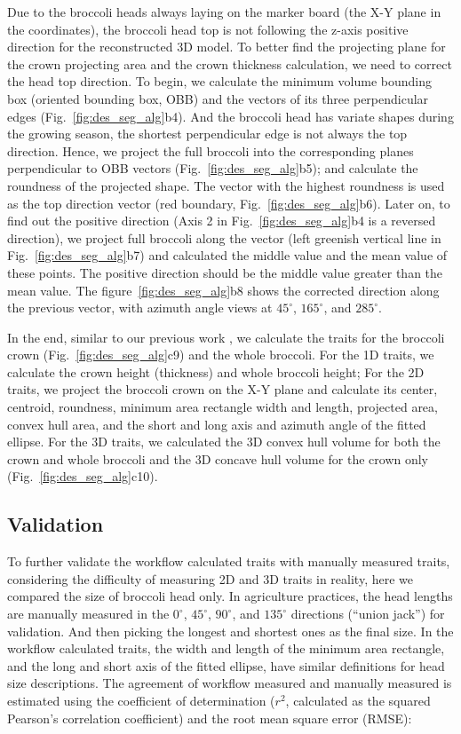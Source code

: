 Due to the broccoli heads always laying on the marker board (the X-Y plane in the coordinates), the broccoli head top is not following the z-axis positive direction for the reconstructed 3D model. To better find the projecting plane for the crown projecting area and the crown thickness calculation, we need to correct the head top direction. To begin, we calculate the minimum volume bounding box (oriented bounding box, OBB) and the vectors of its three perpendicular edges (Fig.~\ref{fig:des_seg_alg}b4). And the broccoli head has variate shapes during the growing season, the shortest perpendicular edge is not always the top direction. Hence, we project the full broccoli into the corresponding planes perpendicular to OBB vectors (Fig.~\ref{fig:des_seg_alg}b5); and calculate the roundness of the projected shape. The vector with the highest roundness is used as the top direction vector (red boundary, Fig.~\ref{fig:des_seg_alg}b6). Later on, to find out the positive direction (Axis 2 in Fig.~\ref{fig:des_seg_alg}b4 is a reversed direction), we project full broccoli along the vector (left greenish vertical line in Fig.~\ref{fig:des_seg_alg}b7) and calculated the middle value and the mean value of these points. The positive direction should be the middle value greater than the mean value. The figure~\ref{fig:des_seg_alg}b8 shows the corrected direction along the previous vector, with azimuth angle views at $45^\circ$, $165^\circ$, and $285^\circ$.

In the end, similar to our previous work \citep{feldman_easydcp_2021}, we calculate the traits for the broccoli crown (Fig.~\ref{fig:des_seg_alg}c9) and the whole broccoli. For the 1D traits, we calculate the crown height (thickness) and whole broccoli height; For the 2D traits, we project the broccoli crown on the X-Y plane and calculate its center, centroid, roundness, minimum area rectangle width and length, projected area, convex hull area, and the short and long axis and azimuth angle of the fitted ellipse. For the 3D traits, we calculated the 3D convex hull volume for both the crown and whole broccoli and the 3D concave hull volume for the crown only (Fig.~\ref{fig:des_seg_alg}c10).

\subsection{Validation}

To further validate the workflow calculated traits with manually measured traits, considering the difficulty of measuring 2D and 3D traits in reality, here we compared the size of broccoli head only. In agriculture practices, the head lengths are manually measured in the $0^\circ$, $45^\circ$, $90^\circ$, and $135^\circ$ directions (``union jack'') for validation. And then picking the longest and shortest ones as the final size. In the workflow calculated traits, the width and length of the minimum area rectangle, and the long and short axis of the fitted ellipse, have similar definitions for head size descriptions. The agreement of workflow measured and manually measured is estimated using the coefficient of determination ($r^2$, calculated as the squared Pearson's correlation coefficient) and the root mean square error (RMSE):

